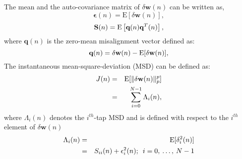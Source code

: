 \vspace{-0.5cm}
\par
\noindent The mean and the auto-covariance matrix of $\delta\textbf{w}(n)$ can be written as,
\vspace{-0.1cm}
\begin{equation}
\boldsymbol \epsilon(n)=\mathrm{E}[\delta\textbf{w}(n)], \label{eq27}
\end{equation}
\vspace{-1.5cm}
\begin{equation}
\textbf{S}(n)=\mathrm{E}\left[\textbf{q}(n)\textbf{q}^{T}(n)\right], \label{eq28}\vspace{-0.1cm}
\end{equation}
\noindent where $\textbf{q}(n)$ is the zero-mean misalignment vector defined as:
\vspace{-0.1cm}
\begin{equation}
\textbf{q}(n)=\delta \textbf{w}(n)-\mathrm{E}[\delta \textbf{w}(n)], \label{eq29}\vspace{-0.1cm}
\end{equation}
\noindent The instantaneous mean-square-deviation (MSD) can be defined as:
 \vspace{-0.1cm}
\begin{eqnarray}
\nonumber
J(n)&=&\mathrm{E}[\|\delta \textbf{w}(n)\|_p^p]\\
&=&\sum_{i=0}^{N-1}\Lambda_{i}(n), \label{eq30}\vspace{-0.1cm}
\end{eqnarray}
\noindent where $\Lambda_{i}(n)$ denotes the $i^{th}$-tap MSD and is defined with respect to the $i^{th}$ element of $\delta\textbf{w}(n)$
\vspace{-0.1cm}
\begin{eqnarray}
\nonumber
\Lambda_{i}(n)&=&\mathrm{E}[\delta_{i}^{2}(n)]\\
&=& S_{ii}(n) + \epsilon_{i}^{2}(n); \hspace{5pt} i=0,\hspace{2pt}\ldots,\hspace{2pt} N-1 \label{eq31}\vspace{-0.1cm}
\end{eqnarray}
